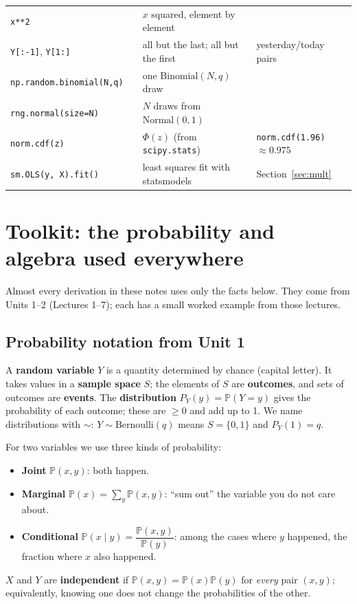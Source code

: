 \documentclass[11pt]{article}
\renewcommand{\P}{\mathbb{P}}
\newcommand{\given}{\mid}
\newcommand{\Bern}{\text{Bernoulli}}
\newcommand{\Bin}{\text{Binomial}}
\newcommand{\Norm}{\text{Normal}}
\newcommand{\py}[1]{\texttt{#1}}
\begin{document}
{\begin{longtable}{@{}>{\raggedright\arraybackslash}p{2.5cm}>{\raggedright\arraybackslash}p{3.0cm}>{\raggedright\arraybackslash}p{5.5cm}>{\raggedright\arraybackslash}p{4.5cm}@{}}
\py{x**2} & & $x$ squared, element by element & \\
\py{Y[:-1]}, \py{Y[1:]} & & all but the last; all but the first & yesterday/today pairs\\
\py{np.random.}\allowbreak\py{binomial(N,q)} & & one $\Bin(N,q)$ draw & \\
\py{rng.normal(}\allowbreak\py{size=N)} & & $N$ draws from $\Norm(0,1)$ & \\
\py{norm.cdf(z)} & & $\Phi(z)$ (from \py{scipy.stats}) & \py{norm.cdf(1.96)} $\approx0.975$\\
\py{sm.OLS(y, X).fit()} & & least squares fit with statsmodels & Section~\ref{sec:mult}\\
\end{longtable}
}

\clearpage
\section{Toolkit: the probability and algebra used everywhere}\label{sec:toolkit}
Almost every derivation in these notes uses only the facts below. They come from Units 1--2 (Lectures 1--7); each has a small worked
example from those lectures.

\subsection{Probability notation from Unit 1}
A \textbf{random variable} $Y$ is a quantity determined by chance (capital letter). It takes values in a \textbf{sample space} $S$; the
elements of $S$ are \textbf{outcomes}, and sets of outcomes are \textbf{events}. The \textbf{distribution} $P_Y(y)=\P(Y=y)$ gives the
probability of each outcome; these are $\ge0$ and add up to 1. We name distributions with $\sim$: $Y\sim\Bern(q)$ means
$S=\{0,1\}$ and $P_Y(1)=q$.

For two variables we use three kinds of probability:
\begin{itemize}[leftmargin=*,itemsep=2pt]
\item \textbf{Joint} $\P(x,y)$: both happen.
\item \textbf{Marginal} $\P(x)=\sum_y\P(x,y)$: ``sum out'' the variable you do not care about.
\item \textbf{Conditional} $\P(x\given y)=\dfrac{\P(x,y)}{\P(y)}$: among the cases where $y$ happened, the fraction where $x$ also happened.
\end{itemize}
$X$ and $Y$ are \textbf{independent} if $\P(x,y)=\P(x)\P(y)$ for \emph{every} pair $(x,y)$; equivalently, knowing one does not change the
probabilities of the other.
\end{document}
